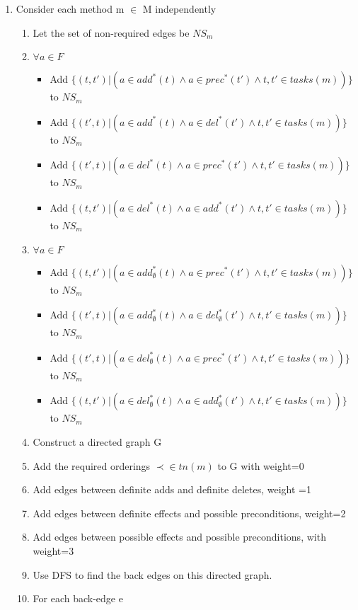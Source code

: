 \begin{enumerate}
	\item Consider each method m $\in$ M independently
	\begin{enumerate}	
		\item Let the set of non-required edges be $NS_m$
		\item $\forall a \in F$
		\begin{itemize}			
			\item Add $\{ (t, t') |  (a \in add^{*}(t) \land a \in prec^{*}(t') \land t, t' \in tasks(m) ) \}$ to $NS_m$ 
			\item Add $\{ (t', t) |  (a \in add^{*}(t) \land a \in del^{*}(t') \land t, t' \in tasks(m) ) \}$ to $NS_m$ 
			\item Add $\{ (t', t) |  (a \in del^{*}(t) \land a \in prec^{*}(t') \land t, t' \in tasks(m) ) \}$ to $NS_m$ 
			\item Add $\{ (t, t') |  (a \in del^{*}(t) \land a \in add^{*}(t') \land t, t' \in tasks(m) ) \}$ to $NS_m$ 
		\end{itemize}
		\item $\forall a \in F$
		\begin{itemize}			
			\item Add $\{ (t, t') |  (a \in add^{*}_{\emptyset}(t) \land a \in prec^{*}(t') \land t, t' \in tasks(m) ) \}$ to $NS_m$ 
			\item Add $\{ (t', t) |  (a \in add^{*}_{\emptyset}(t) \land a \in del^{*}_{\emptyset}(t') \land t, t' \in tasks(m) ) \}$ to $NS_m$ 
			\item Add $\{ (t', t) |  (a \in del^{*}_{\emptyset}(t) \land a \in prec^{*}(t') \land t, t' \in tasks(m) ) \}$ to $NS_m$ 
			\item Add $\{ (t, t') |  (a \in del^{*}_{\emptyset}(t) \land a \in add^{*}_{\emptyset}(t') \land t, t' \in tasks(m) ) \}$ to $NS_m$ 
		\end{itemize}
		\item Construct a directed graph G
		\item Add the required orderings $\prec \in tn(m)$ to G with weight=0
		\item Add edges between definite adds and definite deletes, weight =1
		\item Add edges between definite effects and possible preconditions, weight=2
		\item Add edges between possible effects and possible preconditions, with weight=3  
		\item Use DFS to find the back edges on this directed graph.
		\item For each back-edge e

\end{enumerate}
\end{enumerate}
